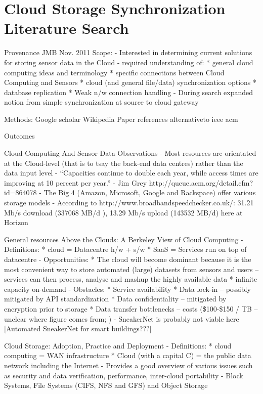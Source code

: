 \section{Cloud Storage Synchronization Literature Search}

Provenance
	JMB
	Nov. 2011
	Scope: 
		- Interested in determining current solutions for storing sensor data in the Cloud
		- required understanding of:
			* general cloud computing ideas and terminology
			* specific connections between Cloud Computing and Sensors
			* cloud (and general file/data) synchronization options
			* database replication
			* Weak n/w connection handling
		- During search expanded notion from simple synchronization at source to cloud gateway

	Methods:
			Google scholar
			Wikipedia
			Paper references
			alternativeto
			ieee
			acm

Outcomes			
	
	Cloud Computing And Sensor Data
		Observations
			- Most resources are orientated at the Cloud-level (that is to tsay the back-end data centres) rather than the data input level
			- ``Capacities continue to double each year, while access times are improving at 10 percent per year.'' - Jim Grey http://queue.acm.org/detail.cfm?id=864078
			- The Big 4 (Amazon, Microsoft, Google and Rackspace) offer various storage models
			- According to http://www.broadbandspeedchecker.co.uk/: 31.21 Mb/s download (337068 MB/d ), 13.29 Mb/s upload (143532 MB/d) here at Horizon
		
		General resources
			Above the Clouds: A Berkeley View of Cloud Computing
				- Definitions: 	* cloud = Datacentre h/w + s/w
								* SaaS = Services run on top of datacentre
				- Opportunities:	* The cloud will become dominant because it is the most convenient way to store automated (large) datasets from sensors and users -- services can then process, analyse and mashup the highly available data 
									* infinite capacity on-demand
				- Obstacles:	* Service availability
								* Data lock-in -- possibly mitigated by API standardization
								* Data confidentiality -- mitigated by encryption prior to storage
								* Data transfer bottlenecks -- costs (\$100-\$150 / TB -- unclear where figure comes from; )
																- SneakerNet is probably not viable here [Automated SneakerNet for smart buildings???]
			
			Cloud Storage: Adoption, Practice and Deployment
				- Definitions: 	* cloud computing = WAN infrastructure
								* Cloud (with a capital C) = the public data network including the Internet
				- Provides a good overview of various issues such as security and data verification, performance, inter-cloud portability
				- Block Systems, File Systems (CIFS, NFS and GFS) and Object Storage


